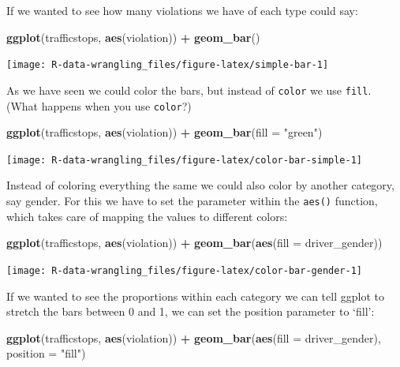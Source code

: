 \documentclass[]{book}
\newenvironment{Shaded}{\begin{snugshade}}{\end{snugshade}}
\newcommand{\KeywordTok}[1]{\textcolor[rgb]{0.13,0.29,0.53}{\textbf{#1}}}
\newcommand{\DataTypeTok}[1]{\textcolor[rgb]{0.13,0.29,0.53}{#1}}
\newcommand{\StringTok}[1]{\textcolor[rgb]{0.31,0.60,0.02}{#1}}
\newcommand{\OperatorTok}[1]{\textcolor[rgb]{0.81,0.36,0.00}{\textbf{#1}}}
\newcommand{\NormalTok}[1]{#1}
\theoremstyle{definition}
\theoremstyle{definition}
\theoremstyle{definition}
\theoremstyle{remark}
\begin{document}
If we wanted to see how many violations we have of each type could say:

\begin{Shaded}
\begin{Highlighting}[]
\KeywordTok{ggplot}\NormalTok{(trafficstops, }\KeywordTok{aes}\NormalTok{(violation)) }\OperatorTok{+}\StringTok{ }
\StringTok{  }\KeywordTok{geom_bar}\NormalTok{()}
\end{Highlighting}
\end{Shaded}

\texttt{[image: R-data-wrangling\_files/figure-latex/simple-bar-1]}

As we have seen we could color the bars, but instead of \texttt{color}
we use \texttt{fill}. (What happens when you use \texttt{color}?)

\begin{Shaded}
\begin{Highlighting}[]
\KeywordTok{ggplot}\NormalTok{(trafficstops, }\KeywordTok{aes}\NormalTok{(violation)) }\OperatorTok{+}\StringTok{ }
\StringTok{  }\KeywordTok{geom_bar}\NormalTok{(}\DataTypeTok{fill =} \StringTok{"green"}\NormalTok{)}
\end{Highlighting}
\end{Shaded}

\texttt{[image: R-data-wrangling\_files/figure-latex/color-bar-simple-1]}

Instead of coloring everything the same we could also color by another
category, say gender. For this we have to set the parameter within the
\texttt{aes()} function, which takes care of mapping the values to
different colors:

\begin{Shaded}
\begin{Highlighting}[]
\KeywordTok{ggplot}\NormalTok{(trafficstops, }\KeywordTok{aes}\NormalTok{(violation)) }\OperatorTok{+}\StringTok{ }
\StringTok{  }\KeywordTok{geom_bar}\NormalTok{(}\KeywordTok{aes}\NormalTok{(}\DataTypeTok{fill =}\NormalTok{ driver_gender))}
\end{Highlighting}
\end{Shaded}

\texttt{[image: R-data-wrangling\_files/figure-latex/color-bar-gender-1]}

If we wanted to see the proportions within each category we can tell
ggplot to stretch the bars between 0 and 1, we can set the position
parameter to `fill':

\begin{Shaded}
\begin{Highlighting}[]
\KeywordTok{ggplot}\NormalTok{(trafficstops, }\KeywordTok{aes}\NormalTok{(violation)) }\OperatorTok{+}\StringTok{ }
\StringTok{  }\KeywordTok{geom_bar}\NormalTok{(}\KeywordTok{aes}\NormalTok{(}\DataTypeTok{fill =}\NormalTok{ driver_gender), }\DataTypeTok{position =} \StringTok{"fill"}\NormalTok{)}
\end{Highlighting}
\end{Shaded}
\end{document}
